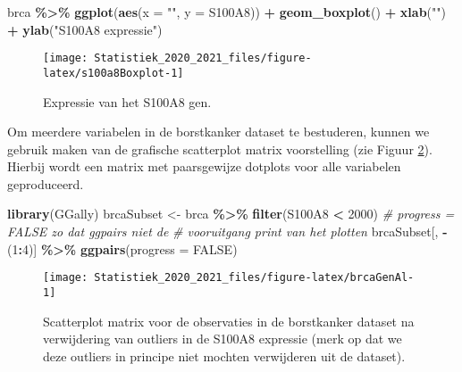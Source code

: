 \documentclass[
  12pt,dutch,coursenotes]{book}
\newenvironment{Shaded}{\begin{snugshade}}{\end{snugshade}}
\newcommand{\CommentTok}[1]{\textcolor[rgb]{0.56,0.35,0.01}{\textit{#1}}}
\newcommand{\DataTypeTok}[1]{\textcolor[rgb]{0.13,0.29,0.53}{#1}}
\newcommand{\DecValTok}[1]{\textcolor[rgb]{0.00,0.00,0.81}{#1}}
\newcommand{\KeywordTok}[1]{\textcolor[rgb]{0.13,0.29,0.53}{\textbf{#1}}}
\newcommand{\NormalTok}[1]{#1}
\newcommand{\OperatorTok}[1]{\textcolor[rgb]{0.81,0.36,0.00}{\textbf{#1}}}
\newcommand{\OtherTok}[1]{\textcolor[rgb]{0.56,0.35,0.01}{#1}}
\newcommand{\StringTok}[1]{\textcolor[rgb]{0.31,0.60,0.02}{#1}}
\theoremstyle{definition}
\theoremstyle{definition}
\theoremstyle{definition}
\theoremstyle{remark}
\begin{document}
\begin{Shaded}
\begin{Highlighting}[]
\NormalTok{brca }\OperatorTok{\%\textgreater{}\%}\StringTok{ }\KeywordTok{ggplot}\NormalTok{(}\KeywordTok{aes}\NormalTok{(}\DataTypeTok{x =} \StringTok{""}\NormalTok{, }\DataTypeTok{y =}\NormalTok{ S100A8)) }\OperatorTok{+}\StringTok{ }\KeywordTok{geom\_boxplot}\NormalTok{() }\OperatorTok{+}\StringTok{ }
\StringTok{    }\KeywordTok{xlab}\NormalTok{(}\StringTok{""}\NormalTok{) }\OperatorTok{+}\StringTok{ }\KeywordTok{ylab}\NormalTok{(}\StringTok{"S100A8 expressie"}\NormalTok{)}
\end{Highlighting}
\end{Shaded}

\begin{figure}

{\centering \texttt{[image: Statistiek\_2020\_2021\_files/figure-latex/s100a8Boxplot-1]} 

}

\caption{Expressie van het S100A8 gen.}\label{fig:s100a8Boxplot}
\end{figure}

Om meerdere variabelen in de borstkanker dataset te bestuderen, kunnen we gebruik maken van de grafische scatterplot matrix voorstelling (zie Figuur \ref{fig:brcaGenAl}). Hierbij wordt een matrix met paarsgewijze dotplots voor alle variabelen geproduceerd.

\begin{Shaded}
\begin{Highlighting}[]
\KeywordTok{library}\NormalTok{(GGally)}
\NormalTok{brcaSubset \textless{}{-}}\StringTok{ }\NormalTok{brca }\OperatorTok{\%\textgreater{}\%}\StringTok{ }\KeywordTok{filter}\NormalTok{(S100A8 }\OperatorTok{\textless{}}\StringTok{ }\DecValTok{2000}\NormalTok{)}
\CommentTok{\# progress = FALSE zo dat ggpairs niet de}
\CommentTok{\# vooruitgang print van het plotten}
\NormalTok{brcaSubset[, }\OperatorTok{{-}}\NormalTok{(}\DecValTok{1}\OperatorTok{:}\DecValTok{4}\NormalTok{)] }\OperatorTok{\%\textgreater{}\%}\StringTok{ }\KeywordTok{ggpairs}\NormalTok{(}\DataTypeTok{progress =} \OtherTok{FALSE}\NormalTok{)}
\end{Highlighting}
\end{Shaded}

\begin{figure}

{\centering \texttt{[image: Statistiek\_2020\_2021\_files/figure-latex/brcaGenAl-1]} 

}

\caption{Scatterplot matrix voor de observaties in de borstkanker dataset na verwijdering van outliers in de S100A8 expressie (merk op dat we deze outliers in principe niet mochten verwijderen uit de dataset).}\label{fig:brcaGenAl}
\end{figure}
\end{document}
